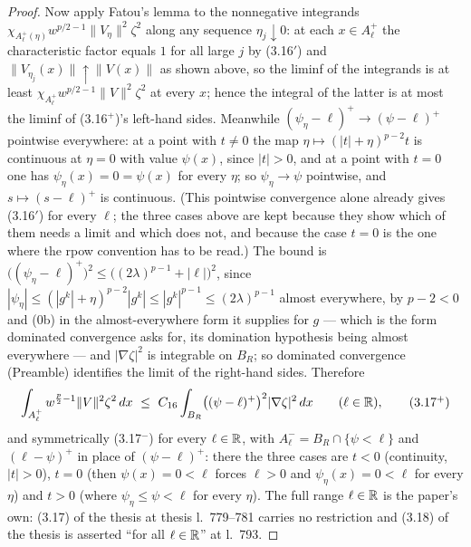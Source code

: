 \begin{proof}
Now apply Fatou's lemma to the nonnegative integrands
$\chi_{A^+_\ell(\eta)}w^{p/2-1}\|V_\eta\|^2\zeta^2$ along any sequence
$\eta_j\downarrow0$: at each $x\in A^+_\ell$ the characteristic factor equals $1$
for all large $j$ by (3.16$'$) and $\|V_{\eta_j}(x)\|\uparrow\|V(x)\|$ as shown
above, so the liminf of the integrands is at least
$\chi_{A^+_\ell}w^{p/2-1}\|V\|^2\zeta^2$ at every $x$; hence the integral of the
latter is at most the liminf of (3.16$^+$)'s left-hand sides.  Meanwhile
$(\psi_\eta-\ell)^+\to(\psi-\ell)^+$ pointwise everywhere: at a point with
$t\ne0$ the map $\eta\mapsto(|t|+\eta)^{p-2}t$ is continuous at $\eta=0$ with
value $\psi(x)$, since $|t|>0$, and at a point with $t=0$ one has
$\psi_\eta(x)=0=\psi(x)$ for every $\eta$; so $\psi_\eta\to\psi$ pointwise, and
$s\mapsto(s-\ell)^+$ is continuous.  (This pointwise convergence alone already
gives (3.16$'$) for every $\ell$; the three cases above are kept because they
show which of them needs a limit and which does not, and because the case $t=0$
is the one where the rpow convention has to be read.)  The bound is
$\bigl((\psi_\eta-\ell)^+\bigr)^2\le\bigl((2\lambda)^{p-1}+|\ell|\bigr)^2$,
since $|\psi_\eta|\le(|g^k|+\eta)^{p-2}|g^k|\le|g^k|^{p-1}\le(2\lambda)^{p-1}$
almost everywhere, by $p-2<0$ and (0b) in the almost-everywhere form it supplies
for $g$ --- which is the form dominated convergence asks for, its domination
hypothesis being almost everywhere --- and $|\nabla\zeta|^2$ is integrable on
$B_R$; so dominated
convergence (Preamble) identifies the limit of the right-hand sides.  Therefore
\[
\int_{A^+_\ell}w^{\frac p2-1}\|V\|^2\zeta^2\,dx
\ \le\ C_{16}\int_{B_R}\bigl((\psi-\ell)^+\bigr)^2|\nabla\zeta|^2\,dx
\qquad(\ell\in\mathbb{R}),
\tag{3.17$^+$}
\]
and symmetrically (3.17$^-$) for every $\ell\in\mathbb{R}$, with $A^-_\ell=B_R\cap
\{\psi<\ell\}$ and $(\ell-\psi)^+$ in place of $(\psi-\ell)^+$: there the three
cases are $t<0$ (continuity, $|t|>0$), $t=0$ (then $\psi(x)=0<\ell$ forces
$\ell>0$ and $\psi_\eta(x)=0<\ell$ for every $\eta$) and $t>0$ (where
$\psi_\eta\le\psi<\ell$ for every $\eta$).  The full range $\ell\in\mathbb{R}$ is the
paper's own: (3.17) of the thesis at thesis l.~779--781 carries no restriction and
(3.18) of the thesis is asserted ``for all $\ell\in\mathbb{R}$'' at l.~793.


\end{proof}
